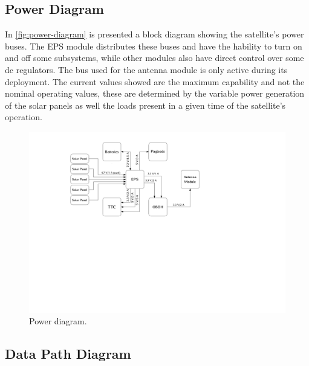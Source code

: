 \subsection{Power Diagram}

In \autoref{fig:power-diagram} is presented a block diagram showing the satellite's power buses.
The EPS module distributes these buses and have the hability to turn on and off some subsystems, while other modules also have direct control over some dc regulators\cite{eps2}.
The bus used for the antenna module is only active during its deployment. 
The current values showed are the maximum capability and not the nominal operating values, these are determined by the variable power generation of the solar panels as well the loads present in a given time of the satellite's operation.

\begin{figure}[!ht]
    \begin{center}
        \includegraphics[width=\textwidth]{figures/power_diagram.pdf}
        \caption{Power diagram.}
        \label{fig:power-diagram}
    \end{center}
\end{figure}


\subsection{Data Path Diagram}

